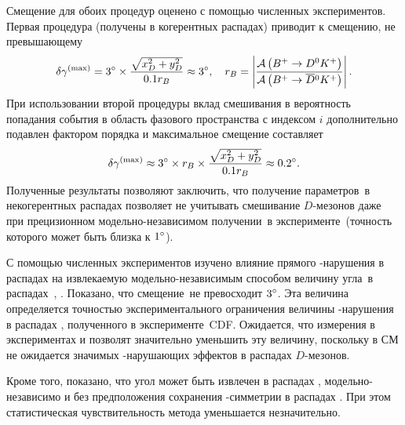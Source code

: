 Смещение \gphi для обоих процедур оценено с помощью численных экспериментов.  Первая процедура (\ki получены в когерентных распадах) приводит к смещению, не превышающему
\begin{equation}
 \delta\gamma^{(\mathrm{max})} = 3^{\circ}\times \frac{\sqrt{x_D^2+y_D^2}}{0.1r_B}\approx 3^{\circ},\quad r_B = \left|\frac{\mathcal{A}\left( B^+\to D^0 K^+\right)}{\mathcal{A}\left( B^+\to\overline{D}{}^0 K^+\right)}\right|.
\end{equation}
При использовании второй процедуры вклад смешивания в вероятность попадания события в область фазового пространства с индексом $i$ дополнительно подавлен фактором порядка \rb и максимальное смещение составляет
\begin{equation}
 \delta\gamma^{(\mathrm{max})} \approx 3^{\circ}\times r_B\times \frac{\sqrt{x_D^2+y_D^2}}{0.1r_B}\approx 0.2^{\circ}.
\end{equation}
Полученные результаты позволяют заключить, что получение параметров~\ki в некогерентных распадах позволяет не учитывать смешивание $D$-мезонов даже при прецизионном модельно-независимом получении~\gphi в эксперименте~\belleii (точность которого может быть близка к $1^{\circ}$).  

С помощью численных экспериментов изучено влияние прямого \cpconj-нарушения в распадах \dnkpp на извлекаемую модельно-независимым способом величину угла~\gphi в распадах~\bdk, \dkpp.  Показано, что смещение~\gphi не превосходит $3^{\circ}$.  Эта величина определяется точностью экспериментального ограничения величины \cpconj-нарушения в распадах \dnkpp, полученного в эксперименте~CDF.  Ожидается, что измерения в экспериментах \lhcb и \belleii позволят значительно уменьшить эту величину, поскольку в СМ не ожидается значимых \cpconj-нарушающих эффектов в распадах $D$-мезонов.  

Кроме того, показано, что угол \gphi может быть извлечен в распадах \bdk, \dkpp модельно-независимо и без предположения сохранения \cpconj-симметрии в распадах \dnkpp. При этом статистическая чувствительность метода уменьшается незначительно.

